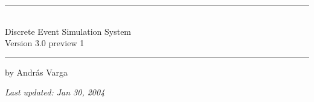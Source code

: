 

\begin{center}\end{center}
\vspace{16em}
\hrule
\vspace{2em}
\begin{center}
\tbf{{\huge {\opp}}}\\
\vspace{1.5em}
{\LARGE Discrete Event Simulation System}\\
\vspace{1em}
{\large Version 3.0 preview 1}\\
\vspace{1em}
\end{center}
\vspace{2em}
\hrule

\vspace{4em}
by {\large Andr\'{a}s Varga}
\vspace{3em}

\textit{Last updated: Jan 30, 2004}



